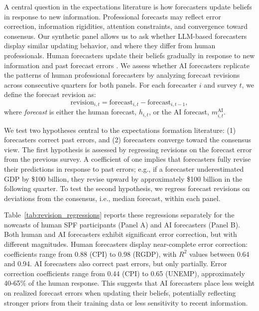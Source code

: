 \documentclass[11pt,letterpaper]{scrartcl}
\begin{document}
A central question in the expectations literature is how forecasters update beliefs in response to new information. Professional forecasts may reflect error correction, information rigidities, attention constraints, and convergence toward consensus. Our synthetic panel allows us to ask whether LLM-based forecasters display similar updating behavior, and where they differ from human professionals. Human forecasters update their beliefs gradually in response to new information and past forecast errors \citep{coibion2012can, bordalo2020overreaction}. We assess whether AI forecasters replicate the patterns of human professional forecasters by analyzing forecast revisions across consecutive quarters for both panels. For each forecaster $i$ and survey $t$, we define the forecast revision as:
\begin{equation}
\text{revision}_{i,t} = \text{forecast}_{i,t} - \text{forecast}_{i,t-1},
\end{equation}
where \emph{forecast} is either the human forecast, $h_{i,t}$, or the AI forecast, $m^\text{AI}_{i,t}$.

We test two hypotheses central to the expectations formation literature: (1) forecasters correct past errors, and (2) forecasters converge toward the consensus view. The first hypothesis is assessed by regressing revisions on the forecast error from the previous survey. A coefficient of one implies that forecasters fully revise their predictions in response to past errors; e.g., if a forecaster underestimated GDP by \$100 billion, they revise upward by approximately \$100 billion in the following quarter. To test the second hypothesis, we regress forecast revisions on deviations from the consensus, i.e., median forecast, within each panel.  

Table~\ref{tab:revision_regressions} reports these regressions separately for the nowcasts of human SPF participants (Panel A) and AI forecasters (Panel B). Both human and AI forecasters exhibit significant error correction, but with different magnitudes. Human forecasters display near-complete error correction: coefficients range from 0.88 (CPI) to 0.98 (RGDP), with $R^2$ values between 0.64 and 0.94. AI forecasters also correct past errors, but only partially. Error correction coefficients range from 0.44 (CPI) to 0.65 (UNEMP), approximately 40-65\% of the human response. This suggests that AI forecasters place less weight on realized forecast errors when updating their beliefs, potentially reflecting stronger priors from their training data or less sensitivity to recent information.
\end{document}
